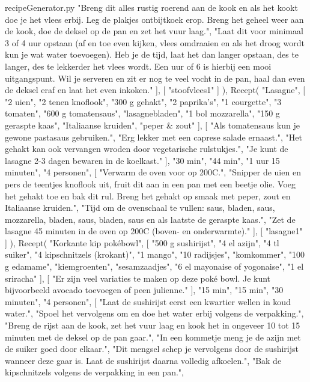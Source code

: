 \begin{filecontents*}{recipeGenerator.py}
		"Breng dit alles rustig roerend aan de kook en als het kookt doe je het vlees erbij. Leg de plakjes ontbijtkoek erop. Breng het geheel weer aan de kook, doe de deksel op de pan en zet het vuur laag.",
		"Laat dit voor minimaal 3 of 4 uur opstaan (af en toe even kijken, vlees omdraaien en als het droog wordt kun je wat water toevoegen). Heb je de tijd, laat het dan langer opstaan, des te langer, des te lekkerder het vlees wordt. Een uur of 6 is hierbij een mooi uitgangspunt. Wil je serveren en zit er nog te veel vocht in de pan, haal dan even de deksel eraf en laat het even inkoken."
	],
	[
		"stoofvlees1"
	]
),
Recept(
	"Lasagne",
	[
		"2 uien",
		"2 tenen knoflook",
		"300 g gehakt",
		"2 paprika's",
		"1 courgette",
		"3 tomaten",
		"600 g tomatensaus",
		"lasagnebladen",
		"1 bol mozzarella",
		"150 g geraspte kaas",
		"Italiaanse kruiden",
		"peper \& zout"
	],
	[
		"Als tomatensaus kun je gewone pastasaus gebruiken.",
		"Erg lekker met een caprese salade ernaast.",
		"Het gehakt kan ook vervangen wroden door vegetarische rulstukjes.",
		"Je kunt de lasagne 2-3 dagen bewaren in de koelkast."
	],
	"30 min",
	"44 min",
	"1 uur 15 minuten",
	"4 personen",
	[
		"Verwarm de oven voor op 200\degree C.",
		"Snipper de uien en pers de teentjes knoflook uit, fruit dit aan in een pan met een beetje olie. Voeg het gehakt toe en bak dit rul. Breng het gehakt op smaak met peper, zout en Italiaanse kruiden.",
		"Tijd om de ovenschaal te vullen: saus, bladen, saus, mozzarella, bladen, saus, bladen, saus en als laatste de geraspte kaas.",
		"Zet de lasagne 45 minuten in de oven op 200\degree C (boven- en onderwarmte)."
	],
	[
		"lasagne1"
	]
),
Recept(
	"Korkante kip pokébowl",
	[
		"500 g sushirijst",
		"4 el azijn",
		"4 tl suiker",
		"4 kipschnitzels (krokant)",
		"1 mango",
		"10 radijsjes",
		"komkommer",
		"100 g edamame",
		"kiemgroenten",
		"sesamzaadjes",
		"6 el mayonaise of yogonaise",
		"1 el sriracha"
	],
	[
		"Er zijn veel variaties te maken op deze poké bowl. Je kunt bijvoorbeeld avocado toevoegen of peen julienne."
	],
	"15 min",
	"15 min",
	"30 minuten",
	"4 personen",
	[
		"Laat de sushirijst eerst een kwartier wellen in koud water.",
		"Spoel het vervolgens om en doe het water erbij volgens de verpakking.",
		"Breng de rijst aan de kook, zet het vuur laag en kook het in ongeveer 10 tot 15 minuten met de deksel op de pan gaar.",
		"In een kommetje meng je de azijn met de suiker goed door elkaar.",
		"Dit mengsel schep je vervolgens door de sushirijst wanneer deze gaar is. Laat de sushirijst daarna volledig afkoelen.",
		"Bak de kipschnitzels volgens de verpakking in een pan.",

\end{filecontents*}
